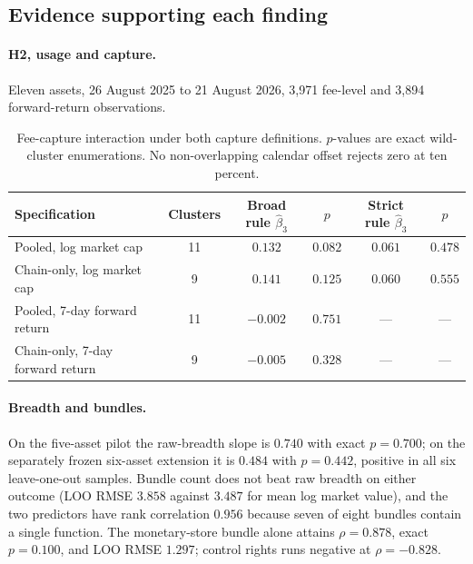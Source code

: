 \documentclass[10pt]{article}
\begin{document}
\subsection{Evidence supporting each finding}

\paragraph{H2, usage and capture.} Eleven assets, 26 August 2025 to 21 August 2026, 3,971 fee-level and 3,894 forward-return observations.

\begin{table}[ht]
\centering
\small
\begin{tabular}{lccccc}
\toprule
Specification & Clusters & Broad rule $\hat{\beta}_3$ & $p$ & Strict rule $\hat{\beta}_3$ & $p$ \\
\midrule
Pooled, log market cap        & 11 & $0.132$  & $0.082$ & $0.061$  & $0.478$ \\
Chain-only, log market cap    & 9  & $0.141$  & $0.125$ & $0.060$  & $0.555$ \\
Pooled, 7-day forward return  & 11 & $-0.002$ & $0.751$ & --- & --- \\
Chain-only, 7-day forward return & 9 & $-0.005$ & $0.328$ & --- & --- \\
\bottomrule
\end{tabular}
\caption{Fee-capture interaction under both capture definitions. $p$-values are exact wild-cluster enumerations. No non-overlapping calendar offset rejects zero at ten percent.}
\end{table}

\paragraph{Breadth and bundles.} On the five-asset pilot the raw-breadth slope is $0.740$ with exact $p = 0.700$; on the separately frozen six-asset extension it is $0.484$ with $p = 0.442$, positive in all six leave-one-out samples. Bundle count does not beat raw breadth on either outcome (LOO RMSE $3.858$ against $3.487$ for mean log market value), and the two predictors have rank correlation $0.956$ because seven of eight bundles contain a single function. The monetary-store bundle alone attains $\rho = 0.878$, exact $p = 0.100$, and LOO RMSE $1.297$; control rights runs negative at $\rho = -0.828$.
\end{document}
